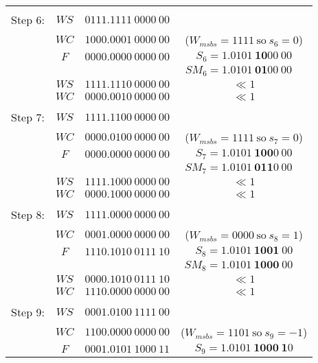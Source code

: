 \documentclass[12pt]{article}
\begin{document}
{\small
\begin{center}
\begin{tabular}{cccc}
    \hdashline\\
    Step 6: &$WS    $&$0111.1111\ 0000\ 00$&\\
            &$WC    $&$1000.0001\ 0000\ 00$&($W_{msbs}=1111\ \text{so}\ s_6=0$)\\
            &$F     $&$0000.0000\ 0000\ 00$&$S_6=\mathbf{1.0101\ 10}00\ 00$\\
            &        &                     &$SM_6=\mathbf{1.0101\ 01}00\ 00\phantom{M}$\\
    \cline{2-3}
            &$WS    $&$1111.1110\ 0000\ 00$&$\ll1$\\
            &$WC    $&$0000.0010\ 0000\ 00$&$\ll1$\\
    \hdashline\\
    Step 7: &$WS    $&$1111.1100\ 0000\ 00$&\\
            &$WC    $&$0000.0100\ 0000\ 00$&($W_{msbs}=1111\ \text{so}\ s_7=0$)\\
            &$F     $&$0000.0000\ 0000\ 00$&$S_7=\mathbf{1.0101\ 100}0\ 00$\\
            &        &                     &$SM_7=\mathbf{1.0101\ 011}0\ 00\phantom{M}$\\
    \cline{2-3}
            &$WS    $&$1111.1000\ 0000\ 00$&$\ll1$\\
            &$WC    $&$0000.1000\ 0000\ 00$&$\ll1$\\
    \hdashline\\
    Step 8: &$WS    $&$1111.0000\ 0000\ 00$&\\
            &$WC    $&$0001.0000\ 0000\ 00$&($W_{msbs}=0000\ \text{so}\ s_8=1$)\\
            &$F     $&$1110.1010\ 0111\ 10$&$S_8=\mathbf{1.0101\ 1001}\ 00$\\
            &        &                     &$SM_8=\mathbf{1.0101\ 1000}\ 00\phantom{M}$\\
    \cline{2-3}
            &$WS    $&$0000.1010\ 0111\ 10$&$\ll1$\\
            &$WC    $&$1110.0000\ 0000\ 00$&$\ll1$\\
    \hdashline\\
    Step 9: &$WS    $&$0001.0100\ 1111\ 00$&\\
            &$WC    $&$1100.0000\ 0000\ 00$&($W_{msbs}=1101\ \text{so}\ s_9=-1$)\\
            &$F     $&$0001.0101\ 1000\ 11$&$S_9=\mathbf{1.0101\ 1000\ 1}0$\\

\end{tabular}
\end{center}}
\end{document}

